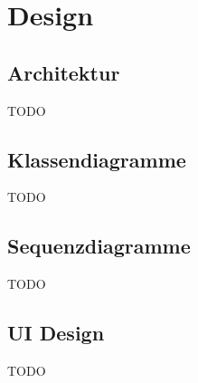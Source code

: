 
\section{Design}
\label{sec:Design}

\subsection{Architektur}
\label{sub:Architektur}

TODO

\subsection{Klassendiagramme}
\label{sub:Klassendiagramme}

TODO

\subsection{Sequenzdiagramme}
\label{sub:Sequenzdiagramme}

TODO

\subsection{UI Design}
\label{sub:UI Design}

TODO
